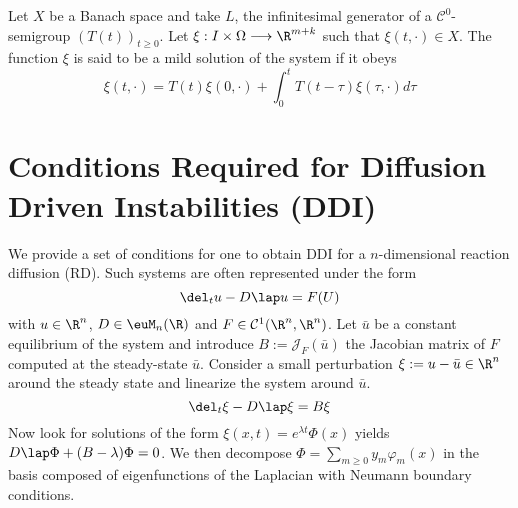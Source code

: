 \begin{definition}
    Let $X$ be a Banach space and take $L$, the infinitesimal generator of a $\mathcal C^0$-semigroup $(T(t))_{t\ge 0}$. Let $\xi : I \times \Omega \longrightarrow \R^{m+k}$ such that $\xi(t, \cdot) \in X$. The function $\xi$ is said to be a mild solution of the system if it obeys
    $$\xi(t, \cdot) = T(t)\xi(0, \cdot) + \int_{0}^{t} T(t- \tau) \xi(\tau, \cdot) d\tau$$
\end{definition}


\section{Conditions Required for Diffusion Driven Instabilities (DDI)}
\label{app:Turing}

We provide a set of conditions for one to obtain DDI for a $n$-dimensional reaction diffusion  (RD). Such systems are often represented under the form
$$\del_t u - D \lap u = F(U)$$
with $u \in \R^n$, $D \in \euM_n(\R)$ and $F \in \mathcal C^1(\R^n, \R^n)$. Let $\bar u$ be a constant equilibrium of the system and introduce $B := \mathcal J_F(\bar u)$ the Jacobian matrix of $F$ computed at the steady-state $\bar u$. Consider a small perturbation $\xi := u - \bar u \in \R^n$ around the steady state and linearize the system around $\bar u$.
$$\del_t \xi - D \lap \xi = B \xi $$
Now look for solutions of the form $\xi(x, t) = e^{\lambda t} \Phi(x)$ yields $D\lap \Phi + (B - \lambda) \Phi = 0$. We then decompose $\Phi = \sum_{m \ge 0} y_m \varphi_m(x)$ in the basis composed of eigenfunctions of the Laplacian with Neumann boundary conditions.
